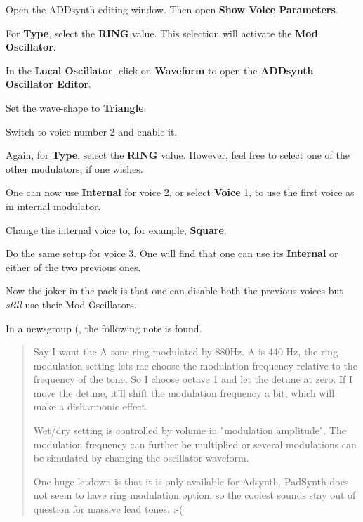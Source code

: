    \begin{enumber}
      \item Open the ADDsynth editing window.  Then open
         \textbf{Show Voice Parameters}.
      \item For \textbf{Type}, select the \textbf{RING} value.  This
         selection will activate the \textbf{Mod Oscillator}.
      \item In the \textbf{Local Oscillator}, click on \textbf{Waveform} to open
         the \textbf{ADDsynth Oscillator Editor}.
      \item Set the wave-shape to \textbf{Triangle}.
      \item Switch to voice number 2 and enable it.
      \item Again, for \textbf{Type}, select the \textbf{RING} value.
         However, feel free to select one of the other modulators, if one
         wishes.
      \item One can now use \textbf{Internal} for voice 2, or select
         \textbf{Voice} 1, to use the first voice as in internal modulator.
      \item Change the internal voice to, for example, \textbf{Square}.
      \item Do the same setup for voice 3.
         One will find that one can use its \textbf{Internal} or
         either of the two previous ones.
   \end{enumber}

   Now the joker in the pack is that one can disable both the previous
   voices but \textsl{still} use their Mod Oscillators.

   In a newsgroup (\cite{ringmodulator}, the following note is found.

   \begin{quotation}
      Say I want the A tone ring-modulated by 880Hz. A is 440 Hz, the ring
      modulation setting lets me choose the modulation frequency relative
      to the frequency of the tone. So I choose octave 1 and let the
      detune at zero. If I move the detune, it'll shift the modulation
      frequency a bit, which will make a disharmonic effect.

      Wet/dry setting is controlled by volume in "modulation amplitude".
      The modulation frequency can further be multiplied or several
      modulations can be simulated by changing the oscillator waveform.

      One huge letdown is that it is only available for Adsynth. PadSynth
      does not seem to have ring modulation option, so the coolest sounds
      stay out of question for massive lead tones. :-(
   \end{quotation}

